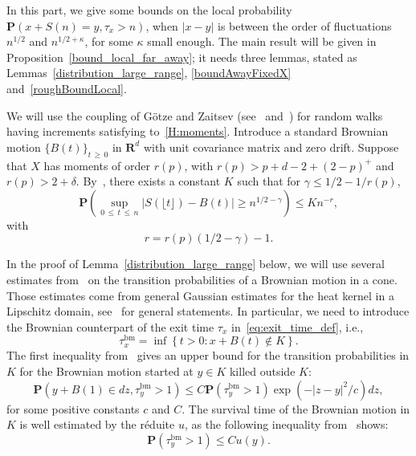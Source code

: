 \documentclass[AHL,Unicode,longabstracts,published]{cedram}
\DeclareMathOperator{\bm}{bm}
\newcommand{\pr}{\mathbf{P}}
\newcommand{\bfR}{\mathbf{R}}
\renewcommand{\leq}{\leqslant}
\renewcommand{\geq}{\geqslant}
\begin{document}
In this part, we give some bounds on the local probability $\pr(x+S(n)=y,\tau_{x}>n)$, when $|x-y|$ is between the order of fluctuations $n^{1/2}$ and $n^{1/2+\kappa}$, for some $\kappa$ small enough. The main result will be given in Proposition~\ref{bound_local_far_away}; it needs three lemmas, stated as Lemmas~\ref{distribution_large_range}, \ref{boundAwayFixedX} and~\ref{roughBoundLocal}.

We will use the coupling of G\"otze and Zaitsev (see~\cite[Theorem~4]{GoZa-09} and~\cite[Lemma~17]{DeWa-15}) for random walks having increments satisfying to~\eqref{H:moments}. Introduce a standard Brownian motion $\{B(t)\}_{t\,\geq\,0}$ in $\bfR^d$ with unit covariance matrix and zero drift. Suppose that $X$ has moments of order $r(p)$, with $r(p)>p+d-2+(2-p)^{+}$ and $r(p)>2+\delta$. By~\cite[Theorem~4]{GoZa-09}, there exists a constant $K$ such that for $\gamma\leq 1/2-1/r(p)$,
\begin{equation}\label{couplingEinmahl}
\pr\left(\sup_{0\,\leq\,t\,\leq\,n}\left| S\left(\lfloor t\rfloor\right)-B(t)\right| \geq n^{1/2-\gamma}\right)\leq Kn^{-r},
\end{equation}
with
\begin{equation}\label{eq:def_local_r}
r=r(p)(1/2-\gamma)-1.
\end{equation}

In the proof of Lemma~\ref{distribution_large_range} below, we will use several estimates from~\cite{RaTa-20} on the transition probabilities of a Brownian motion in a cone. Those estimates come from general Gaussian estimates for the heat kernel in a Lipschitz domain, see~\cite[Section~6]{GySa-11} for general statements. In particular, we need to introduce the Brownian counterpart of the exit time $\tau_x$ in~\eqref{eq:exit_time_def}, i.e.,
\begin{equation}\label{eq:exit_time_bm_def}
\tau_x^{\bm}=\inf\left\{t>0 : x+B(t)\notin K\right\}.
\end{equation}
The first inequality from~\cite[Theorem~5.11]{GySa-11} gives an upper bound for the transition probabilities in $K$ for the Brownian motion started at $y\in K$ killed outside $K$:
\begin{equation}\label{estimateK}
\pr\left(y+ B(1)\in dz,\tau_{y}^{\bm}>1\right)\leq C\pr\left(\tau_{y}^{\bm}>1\right)\exp\left(-|z-y|^{2}/c\right)dz,
\end{equation}
for some positive constants $c$ and $C$. The survival time of the Brownian motion in $K$ is well estimated by the réduite $u$, as the following inequality from~\cite[Theorem~5.4]{GySa-11} shows:
\begin{equation}\label{estimatek}
\pr\left(\tau_{y}^{\bm}>1\right)\leq Cu(y).
\end{equation}
\end{document}
